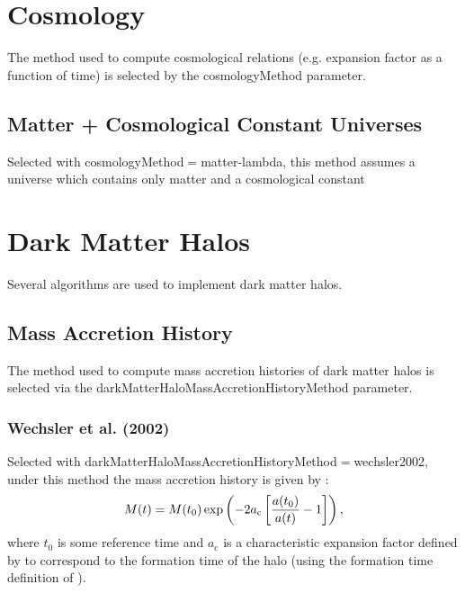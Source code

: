 \section{Cosmology}

The method used to compute cosmological relations (e.g. expansion factor as a function of time) is selected by the {\normalfont \ttfamily cosmologyMethod} parameter.

\subsection{Matter + Cosmological Constant Universes}

Selected with {\normalfont \ttfamily cosmologyMethod}$=${\normalfont \ttfamily matter-lambda}, this method assumes a universe which contains only matter and a cosmological constant

\section{Dark Matter Halos}

Several algorithms are used to implement dark matter halos.

\subsection{Mass Accretion History}

The method used to compute mass accretion histories of dark matter halos is selected via the {\normalfont \ttfamily darkMatterHaloMassAccretionHistoryMethod} parameter.

\subsubsection{Wechsler et al. (2002)}

Selected with {\normalfont \ttfamily darkMatterHaloMassAccretionHistoryMethod}$=${\normalfont \ttfamily wechsler2002}, under this method the mass accretion history is given by \citep{wechsler_concentrations_2002}:
\begin{equation}
M(t) = M(t_0) \exp \left( - 2 a_{\mathrm c} \left[ {a(t_0)\over a(t)}-1 \right] \right),
\end{equation}
where $t_0$ is some reference time and $a_{\mathrm c}$ is a characteristic expansion factor defined by \cite{wechsler_concentrations_2002} to correspond to the formation time of the halo (using the formation time definition of \citealt{bullock_profiles_2001}).

